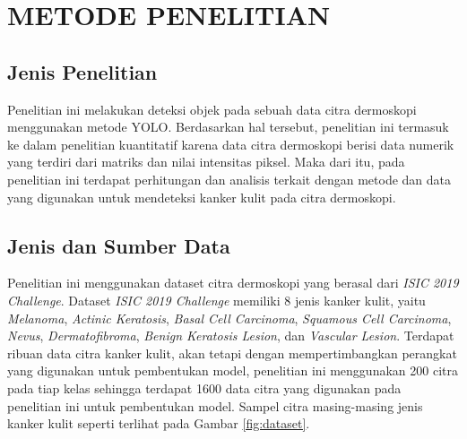 \chapter{METODE PENELITIAN}

\section{Jenis Penelitian}
Penelitian ini melakukan deteksi objek pada sebuah data citra dermoskopi menggunakan metode YOLO. Berdasarkan hal tersebut, penelitian ini termasuk ke dalam penelitian kuantitatif karena data citra dermoskopi berisi data numerik yang terdiri dari matriks dan nilai intensitas piksel. Maka dari itu, pada penelitian ini terdapat perhitungan dan analisis terkait dengan metode dan data yang digunakan untuk mendeteksi kanker kulit pada citra dermoskopi.

\section{Jenis dan Sumber Data}
Penelitian ini menggunakan dataset citra dermoskopi yang berasal dari \textit{ISIC 2019 Challenge}. Dataset \textit{ISIC 2019 Challenge} memiliki 8 jenis kanker kulit, yaitu \textit{Melanoma}, \textit{Actinic Keratosis}, \textit{Basal Cell Carcinoma}, \textit{Squamous Cell Carcinoma}, \textit{Nevus}, \textit{Dermatofibroma}, \textit{Benign Keratosis Lesion}, dan \textit{Vascular Lesion}. Terdapat ribuan data citra kanker kulit, akan tetapi dengan mempertimbangkan perangkat yang digunakan untuk pembentukan model, penelitian ini menggunakan 200 citra pada tiap kelas sehingga terdapat 1600 data citra yang digunakan pada penelitian ini untuk pembentukan model. Sampel citra masing-masing jenis kanker kulit seperti terlihat pada Gambar \ref{fig:dataset}.


